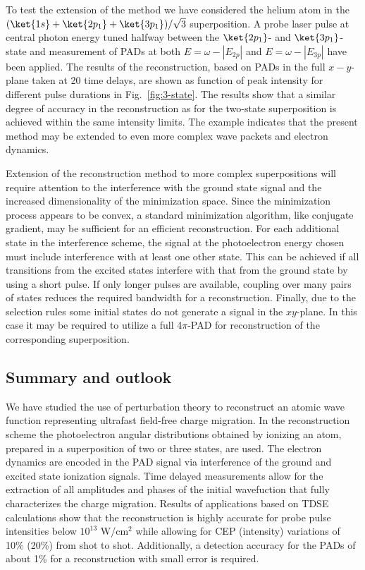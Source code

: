 To test the extension of the method we have considered the helium atom in the $(\ket{1s}+\ket{2p_1}+\ket{3p_1})/\sqrt{3}$ superposition. A probe laser pulse at central photon energy tuned halfway between the $\ket{2p_1}$- and $\ket{3p_1}$-state and measurement of PADs at both $E=\omega-|E_{2p}|$ and $E=\omega-|E_{3p}|$ have been applied. The results of the reconstruction, based on PADs in the full $x-y$-plane taken at 20 time delays, are shown as function of peak intensity for different pulse durations in Fig.~\ref{fig:3-state}. The results show that a similar degree of accuracy in the reconstruction as for the two-state superposition is achieved within the same intensity limits. The example indicates that the present method may be extended to even more complex wave packets and electron dynamics. 

Extension of the reconstruction method to more complex superpositions will require attention to the interference with the ground state signal and the increased dimensionality of the minimization space. Since the minimization process appears to be convex, a standard minimization algorithm, like conjugate gradient, may be sufficient for an efficient reconstruction. For each additional state in the interference scheme, the signal at the photoelectron energy chosen must include interference with at least one other state. This can be achieved if all transitions from the excited states interfere with that from the ground state by using a short pulse. If only longer pulses are available, coupling over many pairs of states reduces the required bandwidth for a reconstruction. Finally, due to the selection rules some initial states do not generate a signal in the $xy$-plane. In this case it may be required to utilize a full 4$\pi$-PAD for reconstruction of the corresponding superposition.

\subsection{Summary and outlook}

We have studied the use of perturbation theory to reconstruct an atomic wave function representing ultrafast field-free charge migration. In the reconstruction scheme the photoelectron angular distributions obtained by ionizing an atom, prepared in a superposition of two or three states, are used. The electron dynamics are encoded in the PAD signal via interference of the ground and excited state ionization signals. Time delayed measurements allow for the extraction of all amplitudes and phases of the initial wavefuction that fully characterizes the charge migration. Results of applications based on TDSE calculations show that the reconstruction is highly accurate for probe pulse intensities below $10^{13}$ W/cm$^2$ while allowing for CEP (intensity) variations of 10\% (20\%) from shot to shot. Additionally, a detection accuracy for the PADs of about 1\% for a  reconstruction with small error is required.

